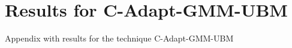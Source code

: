 \chapter{Results for C-Adapt-GMM-UBM}
\label{apx:c-adapt-gmm-ubm-results}

Appendix with results for the technique C-Adapt-GMM-UBM